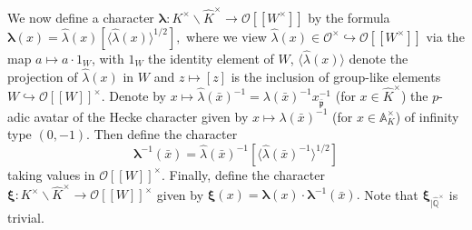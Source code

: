 \documentclass[a4paper,11pt]{amsart}
\numberwithin{equation}{section}
\theoremstyle{plain}
\theoremstyle{definition}
\theoremstyle{remark}
\newcommand{\Q}{\mathbb{Q}}
\newcommand{\A}{\mathbb{A}}
\newcommand{\I}{\mathbb{I}}
\newcommand{\pwseries}[1]{[[ #1]]}
\begin{document}

We now define a character 
${\boldsymbol{\lambda}}\colon K^\times\backslash\widehat{K}^\times\rightarrow\mathcal{O} [[W^\times]]$
by the formula 
$
{\boldsymbol{\lambda}}(x)=\hat{\lambda}(x)[\langle\hat{\lambda}(x)\rangle^{1/2}],$
where we view $\hat{\lambda}(x) \in \mathcal{O}^\times \hookrightarrow \mathcal{O} [[W^\times]]$ via the map $a\mapsto a\cdot 1_{W}$, with $1_W$ the identity element of $W$, $\langle \hat{\lambda}(x) \rangle$ denote the projection of $\hat{\lambda}(x)$ in $W$ and $z\mapsto [z]$ is the inclusion of group-like elements 
$W\hookrightarrow\mathcal{O}[[W]]^\times$.
Denote by $x \mapsto \hat{\lambda}(\bar{x})^{-1}=\lambda(\bar{x})^{-1}x_{\bar{\mathfrak{p}}}^{-1}$ (for $x \in \widehat{K}^{\times}$) the $p$-adic avatar of the Hecke character given by $x \mapsto \lambda(\bar{x})^{-1}$ (for $x \in \A^\times_K$) of infinity type $(0,-1)$. Then define the character
\[
{\boldsymbol{\lambda}}^{-1}(\bar{x})=\hat{\lambda}(\bar{x})^{-1}[\langle\hat{\lambda}(\bar{x})^{-1}\rangle^{1/2}]\]
taking values in $\mathcal{O}[[W]]^\times$. 
Finally, define the character ${\boldsymbol{\xi}}\colon K^\times\backslash\widehat{K}^\times\rightarrow \mathcal{O}[[W]]^\times$ given by
$
{\boldsymbol{\xi}}(x)={\boldsymbol{\lambda}}(x)\cdot{\boldsymbol{\lambda}}^{-1}(\bar x).$
Note that ${\boldsymbol{\xi}}_{|\widehat{\Q}^\times}$ is trivial. 
\end{document}
